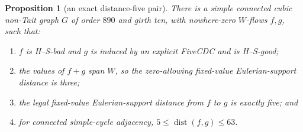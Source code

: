 \documentclass[11pt]{article}
\newtheorem{proposition}[theorem]{Proposition}
\theoremstyle{definition}
\theoremstyle{remark}
\newcommand{\dist}{\operatorname{dist}}
\numberwithin{equation}{section}
\begin{document}
\begin{proposition}[an exact distance-five pair]
\label{prop:distance-five}
There is a simple connected cubic non-Tait graph \(G\) of order \(890\)
and girth ten, with nowhere-zero \(W\)-flows \(f,g\), such that:
\begin{enumerate}
\item \(f\) is H--S-bad and \(g\) is induced by an explicit FiveCDC
      and is H--S-good;
\item the values of \(f+g\) span \(W\), so the zero-allowing
      fixed-value Eulerian-support distance is three;
\item the legal fixed-value Eulerian-support distance from \(f\) to
      \(g\) is exactly five; and
\item for connected simple-cycle adjacency,
      \(5\leq\dist(f,g)\leq63\).
\end{enumerate}
\end{proposition}
\end{document}
